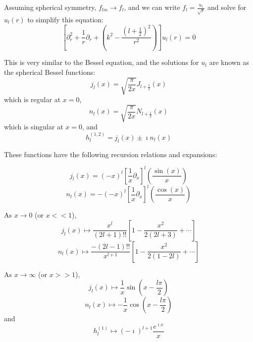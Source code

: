 \documentclass[a4paper,twoside,master.tex]{subfiles}
\begin{document}
Assuming spherical symmetry, $ f_{lm} \to f_l $, and we can write $ f_l = \frac{u_l}{\sqrt{r}} $ and solve for $ u_l(r) $ to simplify this equation:
\begin{equation}
    \left[ \partial_r^2 + \frac{1}{r} \partial_r + \left( k^2 - \frac{\left( l + \frac{1}{2} \right)^2}{r^2} \right) \right] u_l(r) = 0
\end{equation}

This is very similar to the Bessel equation, and the solutions for $ u_l $ are known as the spherical Bessel functions:
\begin{equation}
    j_l(x) = \sqrt{\frac{\pi}{2x}} J_{l + \frac{1}{2}}(x)
\end{equation}
which is regular at $ x = 0 $,
\begin{equation}
    n_l(x) = \sqrt{\frac{\pi}{2x}} N_{l + \frac{1}{2}}(x)
\end{equation}
which is singular at $ x = 0 $, and
\begin{equation}
    h_l^{(1,2)} = j_l(x) \pm \imath n_l(x)
\end{equation}

These functions have the following recursion relations and expansions:

\begin{equation}
    j_l(x) = (-x)^l \left[ \frac{1}{x} \partial_x \right]^l \left( \frac{\sin(x)}{x} \right)
\end{equation}
\begin{equation}
    n_l(x) = -(-x)^l \left[ \frac{1}{x} \partial_x \right]^l \left( \frac{\cos(x)}{x} \right)
\end{equation}

As $ x \to 0 $ (or $ x << 1 $),
\begin{equation}
    j_l(x) \mapsto \frac{x^l}{(2l + 1)!!} \left[ 1 - \frac{x^2}{2(2l + 3)} + \cdots \right]
\end{equation}
\begin{equation}
    n_l(x) \mapsto \frac{-(2l-1)!!}{x^{l+1}} \left[ 1 - \frac{x^2}{2(1-2l)} + \cdots \right]
\end{equation}

As $ x \to \infty $ (or $ x >> 1 $),
\begin{equation}
    j_l(x) \mapsto \frac{1}{x} \sin(x - \frac{l \pi}{2})
\end{equation}
\begin{equation}
    n_l(x) \mapsto - \frac{1}{x} \cos(x - \frac{l \pi}{2}) 
\end{equation}
and
\begin{equation}
    h_l^{(1)} \mapsto (- \imath)^{l+1} \frac{e^{\imath x}}{x}
\end{equation}
\end{document}
